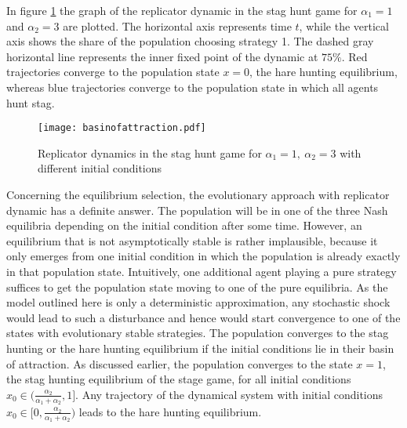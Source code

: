 In figure \ref{fig:basinofattraction} the graph of the replicator dynamic
in the stag hunt game for $\alpha_1=1$ and $\alpha_2=3$ are plotted. The
horizontal axis represents time $t$, while the vertical axis shows
the share of the population choosing strategy 1. The dashed gray horizontal
line represents the inner fixed point of the dynamic at $75\%$.
Red trajectories converge to the population state $x=0$, the hare hunting
equilibrium, whereas blue trajectories converge to the population state in 
which all agents hunt stag.
\begin{figure}
 \centering
        \texttt{[image: basinofattraction.pdf]}
        \caption[Replicator Dynamic of the Stag Hunt Game]{Replicator dynamics in the stag hunt game for 
                $\alpha_1=1,\ \alpha_2=3$ with different initial conditions}
                \label{fig:basinofattraction}
\end{figure}

Concerning the equilibrium selection, the evolutionary approach with replicator
dynamic has a definite answer. The population will be in one of the three
Nash equilibria depending on the initial condition after some time. 
However, an equilibrium that is not asymptotically stable 
is rather implausible,
because it only emerges from one initial condition in which the population
is already exactly in that population state. 
Intuitively, one additional agent playing
a pure strategy suffices to get the population state moving to one of the
pure equilibria. As the model outlined here is only a deterministic
approximation, any stochastic shock would lead to such a disturbance and hence
would start convergence to one of the states with evolutionary stable 
strategies.
The population converges to the stag hunting or the hare
hunting equilibrium if the initial conditions lie in their 
basin of attraction.
As discussed earlier, the population converges to the state $x=1$, 
the stag hunting equilibrium of the stage game, for all initial conditions 
$x_0 \in (\frac{\alpha_2}{\alpha_1+\alpha_2},1]$. Any trajectory of the 
dynamical system with initial conditions 
$x_0 \in [0,\frac{\alpha_2}{\alpha_1+\alpha_2})$ leads to the hare hunting
equilibrium. 

